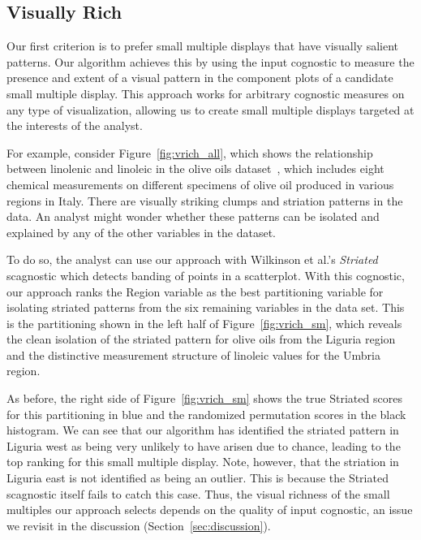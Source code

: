 \subsection{Visually Rich}
Our first criterion is to prefer small multiple displays that have visually salient patterns. Our algorithm achieves this by using the input cognostic to measure the presence and extent of a visual pattern in the component plots of a candidate small multiple display. This approach works for arbitrary cognostic measures on any type of visualization, allowing us to create small multiple displays targeted at the interests of the analyst. 

For example, consider Figure~\ref{fig:vrich_all}, which shows the relationship between linolenic and linoleic in the olive oils dataset~\cite{Forina1983}, which includes eight chemical measurements on different specimens of olive oil produced in various regions in Italy. There are visually striking clumps and striation patterns in the data. An analyst might wonder whether these patterns can be isolated and explained by any of the other variables in the dataset.

To do so, the analyst can use our approach with Wilkinson et al.'s \emph{Striated} scagnostic which detects banding of points in a scatterplot. With this cognostic, our approach ranks the Region variable as the best partitioning variable for isolating striated patterns from the six remaining variables in the data set. This is the partitioning shown in the left half of Figure~\ref{fig:vrich_sm}, which reveals the clean isolation of the striated pattern for olive oils from the Liguria region and the distinctive measurement structure of linoleic values for the Umbria region.

As before, the right side of Figure~\ref{fig:vrich_sm} shows the true Striated scores for this partitioning in blue and the randomized permutation scores in the black histogram. We can see that our algorithm has identified the striated pattern in Liguria west as being very unlikely to have arisen due to chance, leading to the top ranking for this small multiple display. 
Note, however, that the striation in Liguria east is not identified as being an outlier. This is because the Striated scagnostic itself fails to catch this case. Thus, the visual richness of the small multiples our approach selects depends on the quality of input cognostic, an issue we revisit in the discussion (Section~\ref{sec:discussion}).

